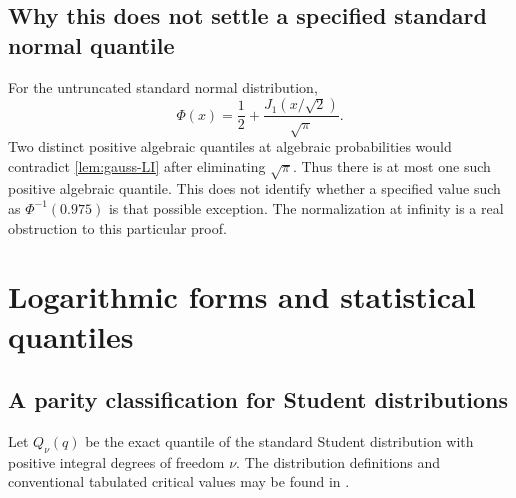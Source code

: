 \documentclass[11pt,a4paper]{article}
\numberwithin{equation}{section}
\theoremstyle{definition}
\theoremstyle{remark}
\begin{document}
\subsection{Why this does not settle a specified standard normal quantile}
For the untruncated standard normal distribution,
\[
 \Phi(x)=\frac12+\frac{J_1(x/\sqrt2)}{\sqrt\pi}.
\]
Two distinct positive algebraic quantiles at algebraic probabilities would
contradict \cref{lem:gauss-LI} after eliminating $\sqrt\pi$. Thus there is at
most one such positive algebraic quantile. This does not identify whether a
specified value such as $\Phi^{-1}(0.975)$ is that possible exception.
The normalization at infinity is a real obstruction to this particular proof.

\section{Logarithmic forms and statistical quantiles}\label{sec:classical-quantiles}
\subsection{A parity classification for Student distributions}
Let $Q_\nu(q)$ be the exact quantile of the standard Student distribution
with positive integral degrees of freedom $\nu$. The distribution definitions
and conventional tabulated critical values may be found in \cite{NIST}.
\end{document}

